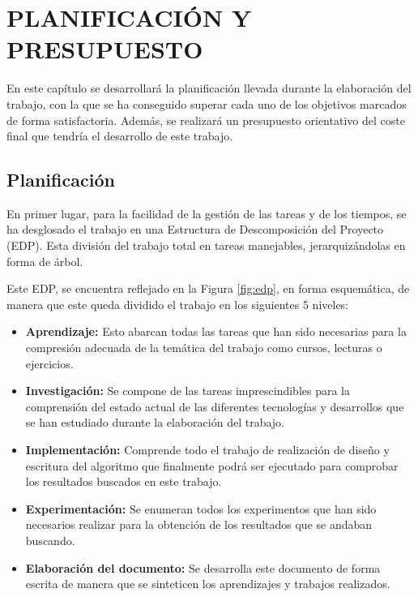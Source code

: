 %
\chapter{PLANIFICACIÓN Y PRESUPUESTO}
\label{sec:planificacionypresupuesto}

En este capítulo se desarrollará la planificación llevada durante la elaboración del trabajo, con la que se ha conseguido superar cada uno de los objetivos marcados de forma satisfactoria. Además, se realizará un presupuesto orientativo del coste final que tendría el desarrollo de este trabajo.

\section{Planificación}

En primer lugar, para la facilidad de la gestión de las tareas y de los tiempos, se ha desglosado el trabajo en una Estructura de Descomposición del Proyecto (EDP). Esta división del trabajo total en tareas manejables, jerarquizándolas en forma de árbol.

Este EDP, se encuentra reflejado en la Figura \ref{fig:edp}, en forma esquemática, de manera que este queda dividido el trabajo en los siguientes 5 niveles:

\begin{itemize}
    \item \textbf{Aprendizaje:} Esto abarcan todas las tareas que han sido necesarias para la compresión adecuada de la temática del trabajo como cursos, lecturas o ejercicios.
    
    \item \textbf{Investigación:} Se compone de las tareas imprescindibles para la comprensión del estado actual de las diferentes tecnologías y desarrollos que se han estudiado durante la elaboración del trabajo.
    
    \item \textbf{Implementación:} Comprende todo el trabajo de realización de diseño y escritura del algoritmo que finalmente podrá ser ejecutado para comprobar los resultados buscados en este trabajo. 
    
    \item \textbf{Experimentación:} Se enumeran todos los experimentos que han sido necesarios realizar para la obtención de los resultados que se andaban buscando.
    
    \item \textbf{Elaboración del documento:} Se desarrolla este documento de forma escrita de manera que se sinteticen los aprendizajes y trabajos realizados.
    
\end{itemize}


